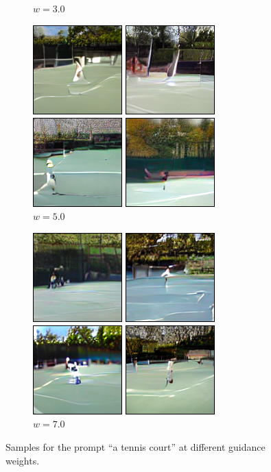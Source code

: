 \documentclass[11pt,a4paper]{article}
\begin{document}
\begin{figure}[!ht]
\begin{subfigure}[b]{0.24\textwidth}
\caption{$w=3.0$}
\end{subfigure}
\begin{subfigure}[b]{0.24\textwidth}
\includegraphics[width=\linewidth]{figures/A_tennis_court_5.png}
\caption{$w=5.0$}
\end{subfigure}
\begin{subfigure}[b]{0.24\textwidth}
\includegraphics[width=\linewidth]{figures/A_tennis_court_7.png}
\caption{$w=7.0$}
\end{subfigure}
\caption{Samples for the prompt ``a tennis court'' at different guidance weights.}
\end{figure}
\end{document}
